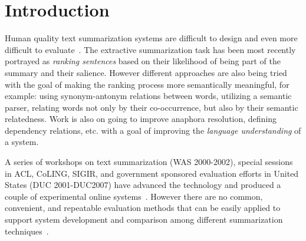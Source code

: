 \documentclass[a4paper]{report}
\begin{document}
\section{Introduction}
Human quality text summarization systems are difficult to design and even more difficult to evaluate~\cite{Goldstein:1999:STD:312624.312665}. The extractive summarization task has been most recently portrayed as \emph{ranking sentences} based on their likelihood of being part of the summary and their salience. However different approaches are also being tried with the goal of making the ranking process more semantically meaningful, for example: using synonym-antonym relations between words, utilizing a semantic parser, relating words not only by their co-occurrence, but also by their semantic relatedness. Work is also on going to improve anaphora resolution, defining dependency relations, etc. with a goal of improving the \emph{language understanding} of a system. 
\par A series of workshops on text summarization (WAS 2000-2002), special sessions in ACL, CoLING, SIGIR, and government sponsored evaluation efforts in United States (DUC 2001-DUC2007) have advanced the technology and produced a couple of experimental online systems~\cite{H01-1056}.  However there are no common, convenient, and repeatable evaluation methods that can be easily applied to support system development and comparison among different summarization techniques~\cite{Lin:2003:AES:1073445.1073465}. 
\end{document}
